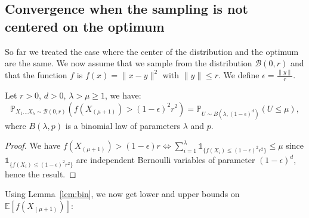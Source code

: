 \subsection{Convergence when the sampling is not centered on the optimum}\label{harder}
So far we treated the case where the center of the distribution and the optimum are the same. We now assume that we sample from the distribution $\mathcal{B}(0,r)$ and that the function $f$ is $f(x) = \lVert x-y\rVert ^2$ with $\lVert y\rVert \leq r$. We define $\epsilon = \frac{\lVert y\rVert }{r}$. 
\begin{lemma}\label{lem:bin} Let $r>0$, $d>0$, $\lambda>\mu\geq1$, we have:
 $$\mathbb{P}_{X_{1}\ldots X_{\lambda}\sim\mathcal{B}(0,r)}(f(X_{(\mu+1)})>(1-\epsilon)^2r^2)= \mathbb{P}_{U\sim B\left(\lambda,(1-\epsilon)^{d}\right)}\left(U\leq \mu\right),$$
where $B(\lambda,p)$ is a binomial law of parameters $\lambda$ and $p$.
\end{lemma}
\begin{proof}
We have
$ f(X_{(\mu+1)})>(1-\epsilon)r\iff \sum_{i=1}^{\lambda} \mathds{1}_{\{f(X_{i})\leq(1-\epsilon)^2r^2\}}\leq \mu$
since $\mathds{1}_{\{f(X_{i})\leq(1-\epsilon)^{2}r^{2}\}}$ are independent Bernoulli variables of parameter $(1-\epsilon)^{d}$,  hence the result.
\end{proof}
Using Lemma~\ref{lem:bin}, we now get lower and upper bounds on $\mathbb{E}\left[f\left(X_{(\mu+1)}\right)\right]$: %
